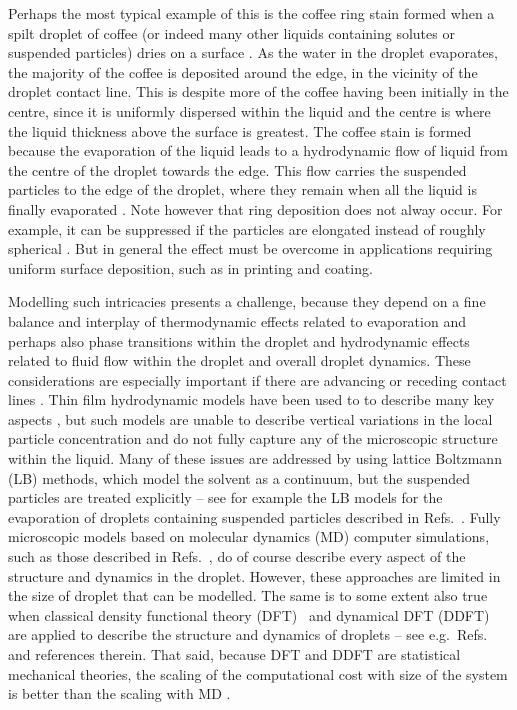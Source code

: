 \documentclass[journal=langd5,manuscript=article]{achemso}
\begin{document}
Perhaps the most typical example of this is the coffee ring stain formed when a spilt droplet of coffee (or indeed many other liquids containing solutes or suspended particles) dries on a surface \cite{han2012learning, routh2013drying, thiele2014patterned, deegan1997,  larson2014}. As the water in the droplet evaporates, the majority of the coffee is deposited around the edge, in the vicinity of the droplet contact line. This is despite more of the coffee having been initially in the centre, since it is uniformly dispersed within the liquid and the centre is where the liquid thickness above the surface is greatest. The coffee stain is formed because the evaporation of the liquid leads to a hydrodynamic flow of liquid from the centre of the droplet towards the edge. This flow carries the suspended particles to the edge of the droplet, where they remain when all the liquid is finally evaporated \cite{routh2013drying, thiele2014patterned, deegan1997, larson2014}. Note however that ring deposition does not alway occur. For example, it can be suppressed if the particles are elongated instead of roughly spherical \cite{yunker2011suppression}. But in general the effect must be overcome in applications requiring uniform surface deposition, such as in printing and coating.

Modelling such intricacies presents a challenge, because they depend on a fine balance and interplay of thermodynamic effects related to evaporation and perhaps also phase transitions within the droplet and hydrodynamic effects related to fluid flow within the droplet and overall droplet dynamics. These considerations are especially important if there are advancing or receding contact lines \cite{bonn2009wetting}. Thin film hydrodynamic models have been used to to describe many key aspects \cite{oron1997, kalliadasis2007, thiele2009, dietrich, frastia2011, frastia2012}, but such models are unable to describe vertical variations in the local particle concentration and do not fully capture any of the microscopic structure within the liquid. { Many of these issues are addressed by using lattice Boltzmann (LB) methods,\cite{kruger2017lattice} which model the solvent as a continuum, but the suspended particles are treated explicitly -- see for example the LB models for the evaporation of droplets containing suspended particles described in Refs.\ .} Fully microscopic models based on molecular dynamics (MD) computer simulations, such as those described in Refs.\ , do of course describe every aspect of the structure and dynamics in the droplet. However, these approaches are limited in the size of droplet that can be modelled. The same is to some extent also true when classical density functional theory (DFT)~\cite{Evans79, Evans92, hansen} and dynamical DFT (DDFT)~\cite{MaTa99, MaTa00, ArEv04, ArRa04, archer06, archer09} are applied to describe the structure and dynamics of droplets -- see e.g.\ Refs.\  and references therein. That said, because DFT and DDFT are statistical mechanical theories, the scaling of the computational cost with size of the system is better than the scaling with MD \cite{goddard2012unification}.
\end{document}
